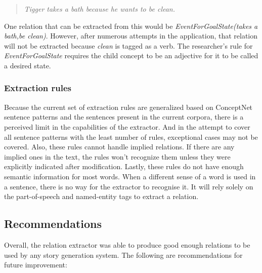 \begin{verse}
\itshape
Tigger takes a bath because he wants to be clean.
\end{verse}

One relation that can be extracted from this would be \textit{EventForGoalState(takes a bath,be clean)}. However, after numerous attempts in the application, that relation will not be extracted because \textit{clean} is tagged as a verb. The researcher's rule for \textit{EventForGoalState} requires the child concept to be an adjective for it to be called a desired state.

\subsubsection{Extraction rules}
\label{sec:templates}

Because the current set of extraction rules are generalized based on ConceptNet sentence patterns and the sentences present in the current corpora, there is a perceived limit in the capabilities of the extractor. And in the attempt to cover all sentence patterns with the least number of rules, exceptional cases may not be covered. Also, these rules cannot handle implied relations. If there are any implied ones in the text, the rules won't recognize them unless they were explicitly indicated after modification. Lastly, these rules do not have enough semantic information for most words. When a different sense of a word is used in a sentence, there is no way for the extractor to recognise it. It will rely solely on the part-of-speech and named-entity tags to extract a relation.

\subsection{Recommendations}
\label{sec:reco}

Overall, the relation extractor was able to produce good enough relations to be used by any story generation system. The following are recommendations for future improvement:

